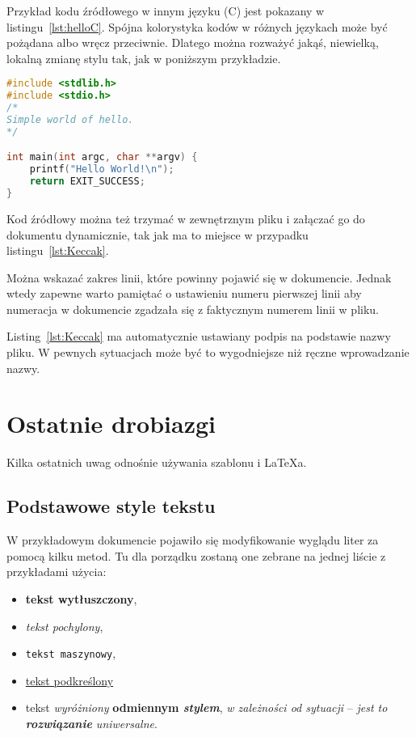 Przykład kodu źródłowego w innym języku (C) jest pokazany w listingu~\ref{lst:helloC}. Spójna kolorystyka kodów w różnych językach może być pożądana albo wręcz przeciwnie. Dlatego można rozważyć jakąś, niewielką, lokalną zmianę stylu tak, jak w poniższym przykładzie.

\begin{lstlisting}[language=C,
    backgroundcolor=\color{EEGold!5!white},
    caption={Prosty program w języku C},
    label={lst:helloC}]
#include <stdlib.h>
#include <stdio.h>
/* 
Simple world of hello.
*/

int main(int argc, char **argv) {
	printf("Hello World!\n");
	return EXIT_SUCCESS;
}
\end{lstlisting}

Kod źródłowy można też trzymać w zewnętrznym pliku i załączać go do dokumentu dynamicznie, tak jak ma to miejsce w przypadku listingu~\ref{lst:Keccak}.

Można wskazać zakres linii, które powinny pojawić się w dokumencie. Jednak wtedy zapewne warto pamiętać o ustawieniu numeru pierwszej linii aby numeracja w dokumencie zgadzała się z faktycznym numerem linii w pliku.

Listing~\ref{lst:Keccak} ma automatycznie ustawiany podpis na podstawie nazwy pliku. W pewnych sytuacjach może być to wygodniejsze niż ręczne wprowadzanie nazwy.



\section{Ostatnie drobiazgi}
Kilka ostatnich uwag odnośnie używania szablonu i \LaTeX{a}.

\subsection{Podstawowe style tekstu}
W przykładowym dokumencie pojawiło się modyfikowanie wyglądu liter za pomocą kilku metod. Tu dla porządku zostaną one zebrane na jednej liście z przykładami użycia:
\begin{itemize}
    \item \textbf{tekst wytłuszczony},
    \item \textit{tekst pochylony},
    \item \texttt{tekst maszynowy},
    \item \underline{tekst podkreślony}
    \item tekst \emph{wyróżniony} \textbf{odmiennym \emph{stylem}}, \textit{w zależności \emph{od sytuacji}} -- \emph{jest to \textbf{rozwiązanie} \textit{uniwersalne}}.
\end{itemize}

